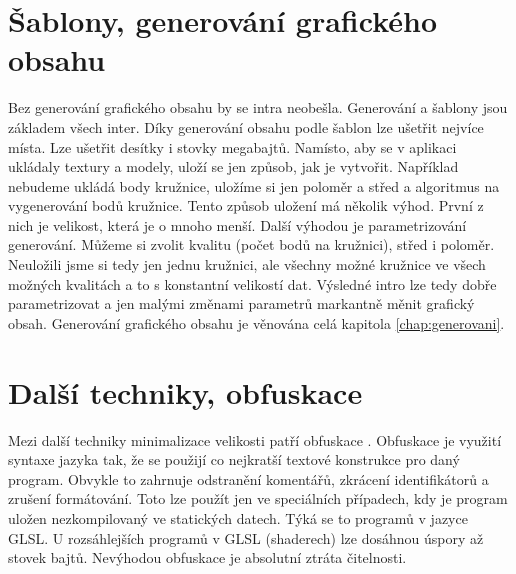 \section{Šablony, generování grafického obsahu}
Bez generování grafického obsahu by se intra neobešla.
Generování a šablony jsou základem všech inter.
Díky generování obsahu podle šablon lze ušetřit nejvíce místa.
Lze ušetřit desítky i stovky megabajtů.
Namísto, aby se v aplikaci ukládaly textury a modely, uloží se jen způsob, jak je vytvořit.
Například nebudeme ukládá body kružnice, uložíme si jen poloměr a střed a algoritmus na vygenerování bodů kružnice.
Tento způsob uložení má několik výhod. První z nich je velikost, která je o mnoho menší.
Další výhodou je parametrizování generování.
Můžeme si zvolit kvalitu (počet bodů na kružnici), střed i poloměr.
Neuložili jsme si tedy jen jednu kružnici, ale všechny možné kružnice ve všech možných kvalitách a to s konstantní velikostí dat.
Výsledné intro lze tedy dobře parametrizovat a jen malými změnami parametrů markantně měnit grafický obsah.
Generování grafického obsahu je věnována celá kapitola \ref{chap:generovani}.

\section{Další techniky, obfuskace}
Mezi další techniky minimalizace velikosti patří obfuskace \cite{OBFUSKACE}.
Obfuskace je využití syntaxe jazyka tak, že se použijí co nejkratší textové konstrukce pro daný program.
Obvykle to zahrnuje odstranění komentářů, zkrácení identifikátorů a zrušení formátování.
Toto lze použít jen ve speciálních případech, kdy je program uložen nezkompilovaný ve statických datech.
Týká se to programů v jazyce GLSL.
U rozsáhlejších programů v GLSL (shaderech) lze dosáhnou úspory až stovek bajtů.
Nevýhodou obfuskace je absolutní ztráta čitelnosti.
